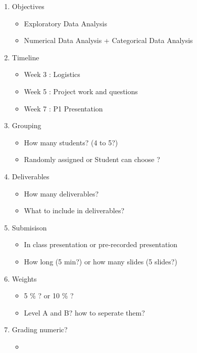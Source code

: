 \documentclass[12pt]{article}
\begin{document}
\begin{enumerate}
    \item Objectives 
    \begin{itemize}
        \item Exploratory Data Analysis 
        \item Numerical Data Analysis + Categorical Data Analysis
    \end{itemize}
    \item Timeline
    \begin{itemize}
        \item Week 3 : Logistics 
        \item Week 5 : Project work and questions
        \item Week 7 : P1 Presentation 
    \end{itemize}

    \item  Grouping 
    \begin{itemize}
        \item How many students? (4 to 5?)
        \item Randomly assigned or Student can choose ? 
    \end{itemize}
    \item Deliverables
    \begin{itemize}
        \item How many deliverables? 
        \item What to include in deliverables? 
    \end{itemize} 
    \item Submisison
    \begin{itemize}
        \item In class presentation or pre-recorded presentation
        \item How long (5 min?) or how many slides (5 slides?)
    \end{itemize}
    \item Weights
    \begin{itemize}
        \item 5 \% ? or 10 \% ?
        \item Level A and B? how to seperate them? 
    \end{itemize}
    \item Grading numeric?
    \begin{itemize}
        \item 
    \end{itemize}


\end{enumerate}
    
\end{document}

